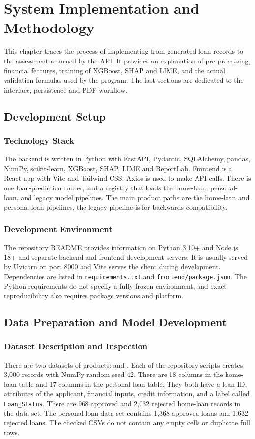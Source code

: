 \chapter[SYSTEM IMPLEMENTATION AND METHODOLOGY]{System Implementation and Methodology}

This chapter traces the process of implementing from generated loan records to the assessment returned by the API. It provides an explanation of pre-processing, financial features, training of XGBoost, SHAP and LIME, and the actual validation formulas used by the program. The last sections are dedicated to the interface, persistence and PDF workflow.

\section{Development Setup}
\subsection{Technology Stack}
The backend is written in Python with FastAPI, Pydantic, SQLAlchemy, pandas, NumPy, scikit-learn, XGBoost, SHAP, LIME and ReportLab. Frontend is a React app with Vite and Tailwind CSS. Axios is used to make API calls. There is one loan-prediction router, and a registry that loads the home-loan, personal-loan, and legacy model pipelines. The main product paths are the home-loan and personal-loan pipelines, the legacy pipeline is for backwards compatibility.

\subsection{Development Environment}
The repository README provides information on Python 3.10+ and Node.js 18+ and separate backend and frontend development servers. It is usually served by Uvicorn on port 8000 and Vite serves the client during development. Dependencies are listed in \texttt{requirements.txt} and \texttt{frontend/package.json}. The Python requirements do not specify a fully frozen environment, and exact reproducibility also requires package versions and platform.

\section{Data Preparation and Model Development}
\subsection{Dataset Description and Inspection}
There are two datasets of products:  and . Each of the repository scripts creates 3,000 records with NumPy random seed 42. There are 18 columns in the home-loan table and 17 columns in the personal-loan table. They both have a loan ID, attributes of the applicant, financial inputs, credit information, and a label called \texttt{Loan\_Status}. There are 968 approved and 2,032 rejected home-loan records in the data set. The personal-loan data set contains 1,368 approved loans and 1,632 rejected loans. The checked CSVs do not contain any empty cells or duplicate full rows.


